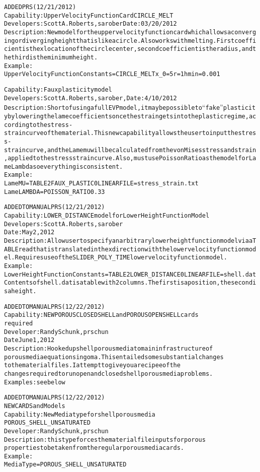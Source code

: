 \documentclass{article}
\begin{document}
\begin{alltt}
ADDED PRS (12/21/2012)
Capability: Upper Velocity Function Card CIRCLE_MELT
Developers: Scott A. Roberts, sarober Date: 03/20/2012
Description: New model for the upper velocity function card which allows a converging or diverging height that is like a circle.  Also works with melting.  First coefficient is the x location of the circle center, second coefficient is the radius, and the third is the minimum height. 
Example: 
Upper Velocity Function Constants = CIRCLE_MELT {x_0=5} {r=1} {hmin=0.001}  

Capability:  Faux plasticity model
Developers:  Scott A. Roberts, sarober, Date:  4/10/2012
Description:  Short of using a full EVP model, it may be possible to ``fake'' plasticity by lowering the lame coefficients once the strain gets into the plastic regime, according to the stress-strain curve of the material.  This new capability allows the user to input the stress-strain curve, and the Lame mu will be calculated from the von Mises stress and strain, applied to the stress strain curve.  Also, must use Poisson Ratio as the model for Lame Lambda so everything is consistent.
Example:
Lame MU       = TABLE 2 FAUX_PLASTIC 0 LINEAR FILE=stress_strain.txt
Lame LAMBDA   = POISSON_RATIO 0.33

ADDED TO MANUAL PRS (12/21/2012)
Capability:  LOWER_DISTANCE model for Lower Height Function Model
Developers:  Scott A. Roberts, sarober
Date:  May 2, 2012
Description:  Allow user to specify an arbitrary lower height function model via a TABLE read that is translated in the x direction with the lower velocity function model.  Requires use of the SLIDER_POLY_TIME lower velocity function model.
Example:
Lower Height Function Constants   = TABLE 2 LOWER_DISTANCE 0 LINEAR FILE=shell.dat
Contents of shell.dat is a table with 2 columns.  The first is a position, the second is a height.

ADDED TO MANUAL PRS (12/22/2012)
Capability:  NEW POROUS CLOSED SHELL and POROUS OPEN SHELL cards
required
Developer: Randy Schunk, prschun
Date June 1, 2012
Description: Hooked up shell porous media to main infrastructure of
porous media equations in goma. This entailed some substantial changes
to the material files.    I attempt to give you a recipee of the
changes required to run open and closed shell porous media problems.
Examples: see below

ADDED TO MANUAL PRS (12/22/2012)
NEW CARDS and Models
Capability: New Media type for shell porous media
POROUS_SHELL_UNSATURATED
Developer: Randy Schunk, prschun
Description: this type forces the material file inputs for porous
properties to be taken from the regular porous media cards. 
Example:
Media Type	 	           = POROUS_SHELL_UNSATURATED


\end{alltt}
\end{document}
